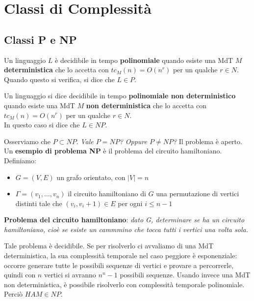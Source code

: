 \section{Classi di Complessità}

\subsection{Classi P e NP}

\begin{defn}[Classe P]
	Un linguaggio $L$ è decidibile in tempo \textbf{polinomiale} quando esiste una MdT $M$ \textbf{deterministica} che lo accetta con $tc_M(n) = O(n^r)$ per un qualche $r \in N$. \\ Quando questo si verifica, si dice che $L \in P$.
\end{defn}

\vspace{0.25cm}

\begin{defn}[Classe NP]
	Un linguaggio si dice decidibile in tempo \textbf{polinomiale non deterministico} quando esiste una MdT $M$ \textbf{non deterministica} che lo accetta con $tc_M(n) = O(n^r)$ per un qualche $r \in N$. \\ In questo caso si dice che $L \in NP$.
\end{defn}

Osserviamo che $P \subset NP$. \textit{Vale $P = NP$? Oppure $P \neq NP$?} Il problema è aperto. \\

Un \textbf{esempio di problema NP} è il problema del circuito hamiltoniano. Definiamo:

\begin{itemize}
	\item $G = (V, E)$ un grafo orientato, con $|V| = n$
	\item $\Gamma = (v_1, \ldots, v_n)$ il circuito hamiltoniano di $G$
		\subitem una permutazione di vertici distinti tale che $(v_i, v_i+1) \in E$ per ogni $i \leq n-1$
\end{itemize}

\noindent\textbf{Problema del circuito hamiltoniano}: \textit{dato G, determinare se ha un circuito hamiltoniano, cioè se esiste un cammmino che tocca tutti i vertici una volta sola.}

Tale problema è decidibile. Se per risolverlo ci avvaliamo di una MdT deterministica, la sua complessità temporale nel caso peggiore è esponenziale: occorre generare tutte le possibili sequenze di vertici e provare a percorrerle, quindi con $n$ vertici si avranno $n^n-1$ possibili sequenze. Usando invece una MdT non deterministica, è possibile risolverlo con complessità temporale polinomiale. Perciò $HAM \in NP$.

